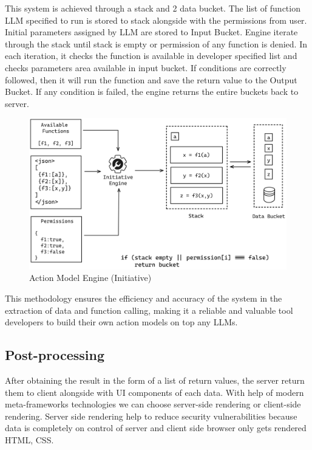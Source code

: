 \noindent  This system is achieved through a stack and 2 data bucket. The list of function LLM specified to run is stored to stack alongside with the permissions from user. Initial parameters assigned by LLM are stored to Input Bucket. Engine iterate through the stack until stack is empty or permission of any function is denied. In each iteration, it checks the function is available in developer specified list and checks parameters area available in input bucket. If conditions are correctly followed, then it will run the function and save the return value to the Output Bucket. If any condition is failed, the engine returns the entire buckets back to server.

\begin{figure}[h!]
    \centering
    \includegraphics[width=\textwidth]{Images/Block_Diag/engine.png}
    \caption{Action Model Engine (Initiative)}
\end{figure}


\noindent This methodology ensures the efficiency and accuracy of the system in the extraction of data and function calling, making it a reliable and valuable tool developers to build their own action models on top any LLMs.

\subsection{Post-processing}

\noindent After obtaining the result in the form of a list of return values, the server return them to client alongside with UI components of each data. With help of modern meta-frameworks technologies we can choose server-side rendering or client-side rendering. Server side rendering help to reduce security vulnerabilities because data is completely on control of server and client side browser only gets rendered HTML, CSS.

